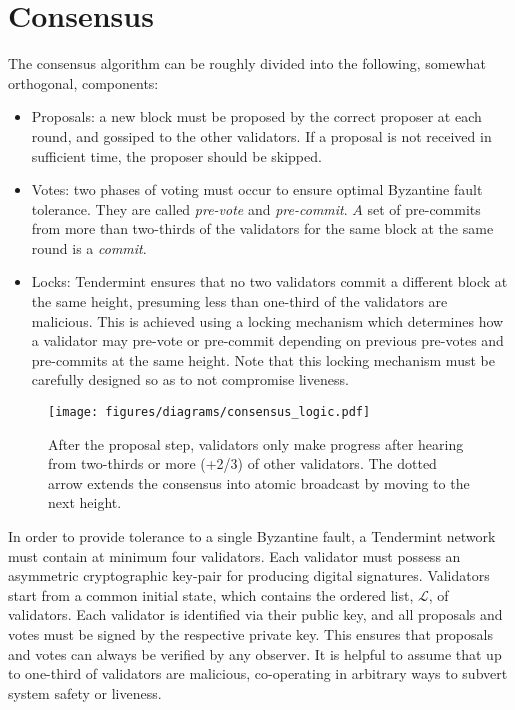 \section{Consensus}

The consensus algorithm can be roughly divided into the following, somewhat orthogonal, components:

\begin{itemize}

\item{Proposals: a new block must be proposed by the correct proposer at each round, and gossiped to the other validators. If a proposal is not received in sufficient time, the proposer should be skipped.}

\item{Votes: two phases of voting must occur to ensure optimal Byzantine fault tolerance. They are called \emph{pre-vote} and \emph{pre-commit}. $A$ set of pre-commits from more than two-thirds of the validators for the same block at the same round is a \emph{commit}.}

\item{Locks: Tendermint ensures that no two validators commit a different block at the same height, presuming less than one-third of the validators are malicious. This is achieved using a locking mechanism which determines how a validator may pre-vote or pre-commit depending on previous pre-votes and pre-commits at the same height. Note that this locking mechanism must be carefully designed so as to not compromise liveness.}

\end{itemize}

\begin{figure}[]
	\texttt{[image: figures/diagrams/consensus\_logic.pdf]}
    	\centering
	\caption[Overview of Tendermint consensus logic]{
After the proposal step, validators only make progress after hearing from two-thirds or more (+2/3) of other validators. The dotted arrow extends the consensus into atomic broadcast by moving to the next height.}
	\label{fig:consensus_logic}
\end{figure}

In order to provide tolerance to a single Byzantine fault, 
a Tendermint network must contain at minimum four validators.
Each validator must possess an asymmetric cryptographic key-pair for producing digital signatures.
Validators start from a common initial state, 
which contains the ordered list, $\mathcal{L}$, of validators.
Each validator is identified via their public key, and 
all proposals and votes must be signed by the respective private key.
This ensures that proposals and votes can always be verified by any observer.
It is helpful to assume that up to one-third of validators are malicious, 
co-operating in arbitrary ways to subvert system safety or liveness.

